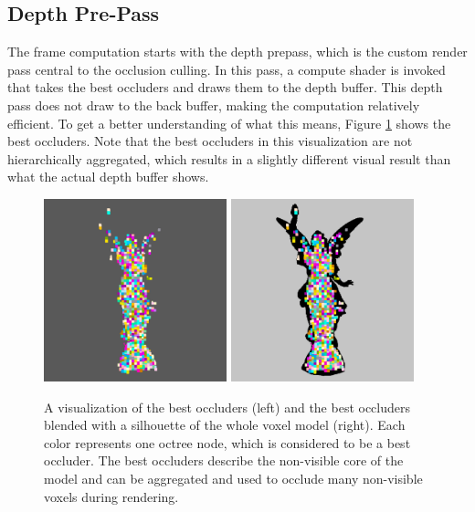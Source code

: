 \clearpage

\subsection*{Depth Pre-Pass} \label{subsec-depth-prepass}

The frame computation starts with the depth prepass, which is the custom render pass central to the 
occlusion culling. In this pass, a compute shader is invoked that takes the best occluders and draws 
them to the depth buffer. This depth pass does not draw to the back buffer, making the computation 
relatively efficient. To get a better understanding of what this means, Figure \ref{fig:best-occluder-viz} 
shows the best occluders. Note that the best occluders in this visualization are not hierarchically 
aggregated, which results in a slightly different visual result than what the actual depth buffer shows. 

\begin{figure}[h]
    \centering
    \includegraphics[width=200px]{images/graphics/lucy-best-occluders-viz.jpg}
    \includegraphics[width=200px]{images/graphics/lucy-best-occluders-diff-viz.jpg}
    \caption{A visualization of the best occluders (left) and the best occluders blended with a silhouette 
    of the whole voxel model (right). Each color represents one octree node, which is considered to be a best occluder.
    The best occluders describe the non-visible core of the model and can be aggregated and used to occlude 
    many non-visible voxels during rendering.}
    \label{fig:best-occluder-viz}
\end{figure}

